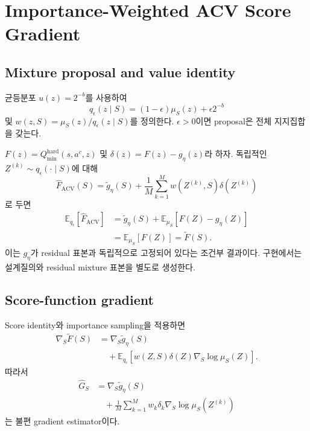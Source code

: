 \documentclass[10pt,journal]{IEEEtran}
\newcommand{\E}{\mathbb{E}}
\begin{document}
\section{Importance-Weighted ACV Score Gradient}
\label{sec:acv}

\subsection{Mixture proposal and value identity}

균등분포 $u(z)=2^{-b}$를 사용하여
\begin{equation}
q_\epsilon(z\mid S)=(1-\epsilon)\mu_S(z)+\epsilon2^{-b}
\label{eq:supp-proposal}
\end{equation}
및 $w(z,S)=\mu_S(z)/q_\epsilon(z\mid S)$를 정의한다. $\epsilon>0$이면 proposal은 전체 지지집합을 갖는다.

$F(z)=Q_{\min}^{\mathrm{hard}}(s,a^c,z)$ 및
$\delta(z)=F(z)-g_\eta(z)$라 하자. 독립적인
$Z^{(k)}\sim q_\epsilon(\cdot\mid S)$에 대해
\begin{equation}
\widehat F_{\mathrm{ACV}}(S)=
\widetilde g_\eta(S)+\frac1M\sum_{k=1}^{M}w(Z^{(k)},S)\delta(Z^{(k)})
\end{equation}
로 두면
\begin{align}
\E_{q_\epsilon}[\widehat F_{\mathrm{ACV}}]
&=\widetilde g_\eta(S)+\E_{\mu_S}[F(Z)-g_\eta(Z)]\\
&=\E_{\mu_S}[F(Z)]=\widetilde F(S).
\end{align}
이는 $g_\eta$가 residual 표본과 독립적으로 고정되어 있다는 조건부 결과이다. 구현에서는 설계질의와 residual mixture 표본을 별도로 생성한다.

\subsection{Score-function gradient}

Score identity와 importance sampling을 적용하면
\begin{align}
\nabla_S\widetilde F(S)
&=\nabla_S\widetilde g_\eta(S)
\nonumber\\
&\quad+\E_{q_\epsilon}\!\left[
w(Z,S)\delta(Z)\nabla_S\log\mu_S(Z)\right].
\label{eq:supp-score-identity}
\end{align}
따라서
\begin{align}
\widehat G_S
&=\nabla_S\widetilde g_\eta(S)
\nonumber\\
&\quad+\frac1M\sum_{k=1}^{M}w_k\delta_k
\nabla_S\log\mu_S(Z^{(k)})
\label{eq:supp-score-estimator}
\end{align}
는 불편 gradient estimator이다.
\end{document}

